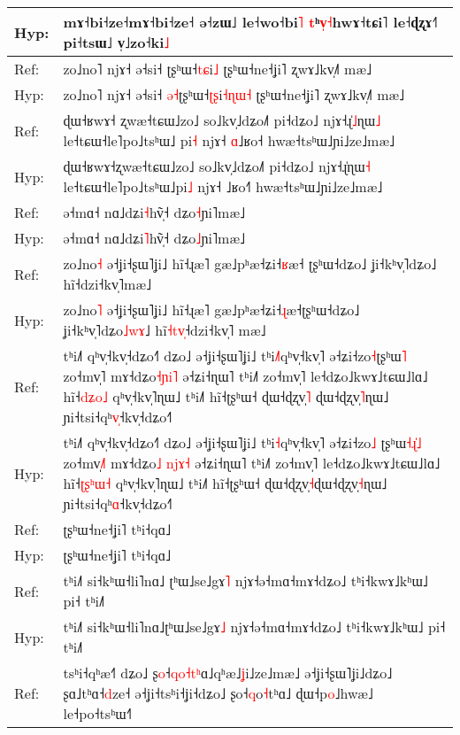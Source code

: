 \documentclass[10pt]{article}
\DeclareRobustCommand{\hl}[1]{{\textcolor{red}{#1}}}
\begin{document}
\begin{longtable}{ll}
Hyp: & mɤ˧bi˧ze˧mɤ˧bi˧ze˧ ə˧zɯ˩ le˧wo˧bi\hl{˥} \hl{t}ʰ\hl{v}\hl{̩}\hl{˧}hwɤ˧tɕi˥ le˧ɖʐɤ˧˥ pi˧tsɯ˩ v̩˩zo˧ki\hl{˩} \\ 
\midrule 
Ref: & zo˩no˥ njɤ˧ ə˧si˧ ʈʂʰɯ˧\hl{t}\hl{ɕ}i\hl{˩} ʈʂʰɯ˧ne˧ʝi˥ ʐwɤ˩kv̩˩˥ mæ˩ \\ 
Hyp: & zo˩no˥ njɤ˧ ə˧si˧ \hl{ə}\hl{˧}ʈʂʰɯ˧\hl{ʈ}\hl{ʂ}i\hl{˧}\hl{ɳ}\hl{ɯ}\hl{˧} ʈʂʰɯ˧ne˧ʝi˥ ʐwɤ˩kv̩˩˥ mæ˩ \\ 
\midrule 
Ref: & ɖɯ˧ʁwɤ˧\hl{ }ʐwæ˧tɕɯ˩zo˩ so˩kv̩˩dʑo˩˥ pi˧dʑo˩ njɤ˧ɻ̍\hl{˩}ɳɯ\hl{˩} le˧tɕɯ˧le˥po˩tsʰɯ˩\hl{ }pi\hl{˧} njɤ˧ \hl{ɑ}˩ʁo˧ hwæ˧tsʰɯ˩ɲi˩ze˩mæ˩ \\ 
Hyp: & ɖɯ˧ʁwɤ˧ʐwæ˧tɕɯ˩zo˩ so˩kv̩˩dʑo˩˥ pi˧dʑo˩ njɤ˧ɻ̍ɳɯ\hl{˧} le˧tɕɯ˧le˥po˩tsʰɯ˩pi\hl{˩} njɤ˧ ˩ʁo˧\hl{˥} hwæ˧tsʰɯ˩ɲi˩ze˩mæ˩ \\ 
\midrule 
Ref: & ə˧mɑ˧ nɑ˩dʑi\hl{˧}hṽ̩˧ dʑo\hl{˧}ɲi˥mæ˩ \\ 
Hyp: & ə˧mɑ˧ nɑ˩dʑi\hl{˥}hṽ̩˧ dʑo\hl{˩}ɲi˥mæ˩ \\ 
\midrule 
Ref: & zo˩no\hl{˧} ə˧ʝi˧ʂɯ˥ʝi˩ hĩ˧ɻæ˥ gæ˩pʰæ˧ʑi˧\hl{ʁ}æ˧\hl{ }ʈʂʰɯ˧dʑo˩ ʝi˧kʰv̩˥dʑo˩ hĩ˧dzi˧kv̩˥mæ˩ \\ 
Hyp: & zo˩no\hl{˥} ə˧ʝi˧ʂɯ˥ʝi˩ hĩ˧ɻæ˥ gæ˩pʰæ˧ʑi˧\hl{ɻ}æ˧ʈʂʰɯ˧dʑo˩ ʝi˧kʰv̩˥dʑo\hl{˩}\hl{w}\hl{ɤ}˩ hĩ\hl{˧}\hl{t}\hl{v}\hl{̩}˧dzi˧kv̩˥\hl{ }mæ˩ \\ 
\midrule 
Ref: & tʰi˩˥ qʰv̩˧kv̩˧dʑo˧˥ dʑo˩ ə˧ʝi˧ʂɯ˥ʝi˩ tʰi\hl{˩}\hl{˥}qʰv̩˧kv̩˥ ə˧ʑi˧zo\hl{˧}ʈʂʰɯ\hl{˥} zo˧mv̩˥ mɤ˧dʑo\hl{˧}\hl{ɲ}\hl{i}\hl{˥} ə˧ʑi˧ɳɯ˥ tʰi˩˥ zo˧mv̩˥ le˧dʑo˩kwɤ˩tɕɯ˩lɑ˩ hĩ˧\hl{d}\hl{ʑ}\hl{o}\hl{˩} qʰv̩˧kv̩˥ɳɯ˩ tʰi˩˥ hĩ˧ʈʂʰɯ˧ ɖɯ˧ɖʐv̩\hl{˥}\hl{ }ɖɯ˧ɖʐv̩\hl{˥}ɳɯ˩ ɲi˧tsi˧qʰ\hl{v}\hl{̩}˧kv̩˧dʑo˧˥ \\ 
Hyp: & tʰi˩˥ qʰv̩˧kv̩˧dʑo˧˥ dʑo˩ ə˧ʝi˧ʂɯ˥ʝi˩ tʰi\hl{˧}qʰv̩˧kv̩˥ ə˧ʑi˧zo\hl{˩}\hl{ }ʈʂʰɯ\hl{˧}\hl{ɻ}\hl{̍}\hl{˩} zo˧mv̩\hl{˩}˥ mɤ˧dʑo\hl{˩}\hl{ }\hl{n}\hl{j}\hl{ɤ}\hl{˧} ə˧ʑi˧ɳɯ˥ tʰi˩˥ zo˧mv̩˥ le˧dʑo˩kwɤ˩tɕɯ˩lɑ˩ hĩ˧\hl{ʈ}\hl{ʂ}\hl{ʰ}\hl{ɯ}\hl{˧} qʰv̩˧kv̩˥ɳɯ˩ tʰi˩˥ hĩ˧ʈʂʰɯ˧ ɖɯ˧ɖʐv̩\hl{˧}ɖɯ˧ɖʐv̩\hl{˧}ɳɯ˩ ɲi˧tsi˧qʰ\hl{ɑ}˧kv̩˧dʑo˧˥ \\ 
\midrule 
Ref: & ʈʂʰɯ˧ne˧ʝi˥ tʰi˧qɑ˩ \\ 
Hyp: & ʈʂʰɯ˧ne˧ʝi˥ tʰi˧qɑ˩ \\ 
\midrule 
Ref: & tʰi˩˥ si˧kʰɯ˧li˥nɑ˩\hl{ }ʈʰɯ˩se˩gɤ\hl{˥} njɤ˧ə˧mɑ˧mɤ˧dʑo˩ tʰi˧kwɤ˩kʰɯ˩ pi˧ tʰi˩˥ \\ 
Hyp: & tʰi˩˥ si˧kʰɯ˧li˥nɑ˩ʈʰɯ˩se˩gɤ\hl{˩}\hl{ } njɤ˧ə˧mɑ˧mɤ˧dʑo˩ tʰi˧kwɤ˩kʰɯ˩ pi˧ tʰi˩˥ \\ 
\midrule 
Ref: & tsʰi˧qʰæ˧˥ dʑo˩ ʂ\hl{o}˧\hl{q}\hl{o}\hl{˧}\hl{t}\hl{ʰ}ɑ˩qʰæ˩\hl{ʝ}i˩ze˩mæ˩ ə˧ʝi˧ʂɯ˥ʝi˩dʑo˩ ʂɑ˩tʰɑ˧\hl{d}ze˧ ə˧ʝi˧tsʰi˧ʝi˧dʑo˩ ʂo˧\hl{q}o\hl{˧}tʰɑ˩ ɖɯ˧p\hl{o}˩hwæ˩ le˧po˧tsʰɯ˧˥ \\ 

\end{longtable}
\end{document}

